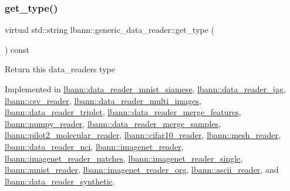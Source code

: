 \subsubsection{\texorpdfstring{get\+\_\+type()}{get\_type()}}
{\footnotesize\ttfamily virtual std\+::string lbann\+::generic\+\_\+data\+\_\+reader\+::get\+\_\+type (\begin{DoxyParamCaption}{ }\end{DoxyParamCaption}) const\hspace{0.3cm}{\ttfamily [pure virtual]}}

Return this data\+\_\+reader\textquotesingle{}s type 

Implemented in \hyperlink{classlbann_1_1data__reader__mnist__siamese_a2c5a29603f850bb0684dba1c64981604}{lbann\+::data\+\_\+reader\+\_\+mnist\+\_\+siamese}, \hyperlink{classlbann_1_1data__reader__jag_ae3f45a65894cb60343676d75a8b7f99c}{lbann\+::data\+\_\+reader\+\_\+jag}, \hyperlink{classlbann_1_1csv__reader_a0ff6a8f07f69a0927ba0bac36ad31864}{lbann\+::csv\+\_\+reader}, \hyperlink{classlbann_1_1data__reader__multi__images_a9939a88a40caf7b2a27de08deca54ac1}{lbann\+::data\+\_\+reader\+\_\+multi\+\_\+images}, \hyperlink{classlbann_1_1data__reader__triplet_a7ff627eed9a4671129cbf7fb9ca11871}{lbann\+::data\+\_\+reader\+\_\+triplet}, \hyperlink{classlbann_1_1data__reader__merge__features_affcf91a640f964ba18de9cb650fb07ad}{lbann\+::data\+\_\+reader\+\_\+merge\+\_\+features}, \hyperlink{classlbann_1_1numpy__reader_a4c26b0cdc9c5c4b09c127e0ab6a72cf6}{lbann\+::numpy\+\_\+reader}, \hyperlink{classlbann_1_1data__reader__merge__samples_a5d24385daebfd31343e6afc11b0439d1}{lbann\+::data\+\_\+reader\+\_\+merge\+\_\+samples}, \hyperlink{classlbann_1_1pilot2__molecular__reader_a8548d10554c6e1ef921cf5d113530e72}{lbann\+::pilot2\+\_\+molecular\+\_\+reader}, \hyperlink{classlbann_1_1cifar10__reader_a0922990dbef860040a7ec2a99a3d3ba2}{lbann\+::cifar10\+\_\+reader}, \hyperlink{classlbann_1_1mesh__reader_a77e340cbb58b30b318eecb6a49ca38b6}{lbann\+::mesh\+\_\+reader}, \hyperlink{classlbann_1_1data__reader__nci_a6709a3d1df162335fa4a6955ea7dcaa2}{lbann\+::data\+\_\+reader\+\_\+nci}, \hyperlink{classlbann_1_1imagenet__reader_a0afea0db8b4286b56211842f8f1d7678}{lbann\+::imagenet\+\_\+reader}, \hyperlink{classlbann_1_1imagenet__reader__patches_adc6363b20f058260c674d92af2a6ef80}{lbann\+::imagenet\+\_\+reader\+\_\+patches}, \hyperlink{classlbann_1_1imagenet__reader__single_aecd9cec6777e4a7485daa5b0396afee0}{lbann\+::imagenet\+\_\+reader\+\_\+single}, \hyperlink{classlbann_1_1mnist__reader_a23c5602f4c0a98ee915f33e434c60d80}{lbann\+::mnist\+\_\+reader}, \hyperlink{classlbann_1_1imagenet__reader__org_ade6e7e9bc1a3f9562c0f274a3d665e0a}{lbann\+::imagenet\+\_\+reader\+\_\+org}, \hyperlink{classlbann_1_1ascii__reader_aee041430b7ef13c8324393568fa89922}{lbann\+::ascii\+\_\+reader}, and \hyperlink{classlbann_1_1data__reader__synthetic_a4093c7f0b76b3c8df2980c6b7b13e163}{lbann\+::data\+\_\+reader\+\_\+synthetic}.

